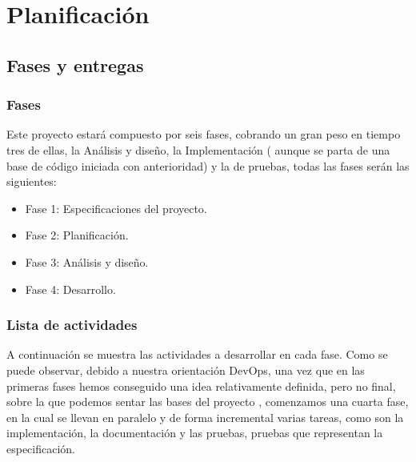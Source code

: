 \chapter{Planificación}

\section {Fases y entregas}
\subsection {Fases}

Este proyecto estará compuesto por seis fases, cobrando un gran peso en tiempo tres de ellas, la Análisis y diseño, la Implementación ( aunque se parta de una base de código iniciada con anterioridad) y la de pruebas, todas las fases serán las siguientes:

\begin{itemize}
  \item Fase 1: Especificaciones del proyecto.
  \item Fase 2: Planificación.
  \item Fase 3: Análisis y diseño.
  \item Fase 4: Desarrollo.
\end{itemize}

\subsection {Lista de actividades}
A continuación se muestra las actividades a desarrollar en cada fase. Como se puede observar, debido a nuestra orientación DevOps, una vez que en las primeras fases hemos conseguido una idea relativamente definida, pero no final, sobre la que podemos sentar las bases del proyecto , comenzamos una cuarta fase, en la cual se llevan en paralelo y de forma incremental varias tareas, como son la implementación, la documentación y las pruebas, pruebas que representan la especificación.

